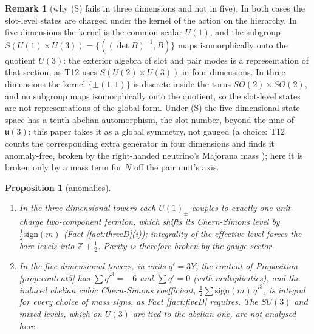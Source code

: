 \documentclass[11pt]{article}
\newtheorem{proposition}[theorem]{Proposition}
\theoremstyle{definition}
\newtheorem{remark}[theorem]{Remark}
\newcommand{\uu}{\mathfrak{u}}
\begin{document}
\begin{remark}[why (S) fails in three dimensions and not in five]\label{rem:S35}
In both cases the slot-level states are charged under the kernel of the action on the hierarchy. In five dimensions the kernel is the common scalar $U(1)$, and the subgroup $S(U(1) \times U(3)) = \{((\det B)^{-1}, B)\}$ maps isomorphically onto the quotient $U(3)$: the exterior algebra of slot and pair modes is a representation of that section, as T12 uses $S(U(2) \times U(3))$ in four dimensions. In three dimensions the kernel $\{\pm(1,1)\}$ is discrete inside the torus $SO(2) \times SO(2)$, and no subgroup maps isomorphically onto the quotient, so the slot-level states are not representations of the global form. Under (S) the five-dimensional state space has a tenth abelian automorphism, the slot number, beyond the nine of $\uu(3)$; this paper takes it as a global symmetry, not gauged (a choice: T12 counts the corresponding extra generator in four dimensions and finds it anomaly-free, broken by the right-handed neutrino's Majorana mass \cite[Prop.~5.8]{ButlerT12}); here it is broken only by a mass term for $N$ off the pair unit's axis.
\end{remark}

\begin{proposition}[anomalies]\label{prop:anomaly}
\begin{enumerate}
\item[(i)] In the three-dimensional towers each $U(1)_{\pm}$ couples to exactly one unit-charge two-component fermion, which shifts its Chern-Simons level by $\tfrac{1}{2}\mathrm{sign}(m)$ (Fact \ref{fact:threeD}(i)); integrality of the effective level forces the bare levels into $\mathbb{Z} + \tfrac{1}{2}$. Parity is therefore broken by the gauge sector.
\item[(ii)] In the five-dimensional towers, in units $q' = 3Y$, the content of Proposition \ref{prop:content5} has $\sum q'^{3} = -6$ and $\sum q' = 0$ (with multiplicities), and the induced abelian cubic Chern-Simons coefficient, $\tfrac{1}{2}\sum \mathrm{sign}(m)\,q'^{3}$, is integral for every choice of mass signs, as Fact \ref{fact:fiveD} requires. The $SU(3)$ and mixed levels, which on $U(3)$ are tied to the abelian one, are not analysed here.
\end{enumerate}
\end{proposition}
\end{document}
